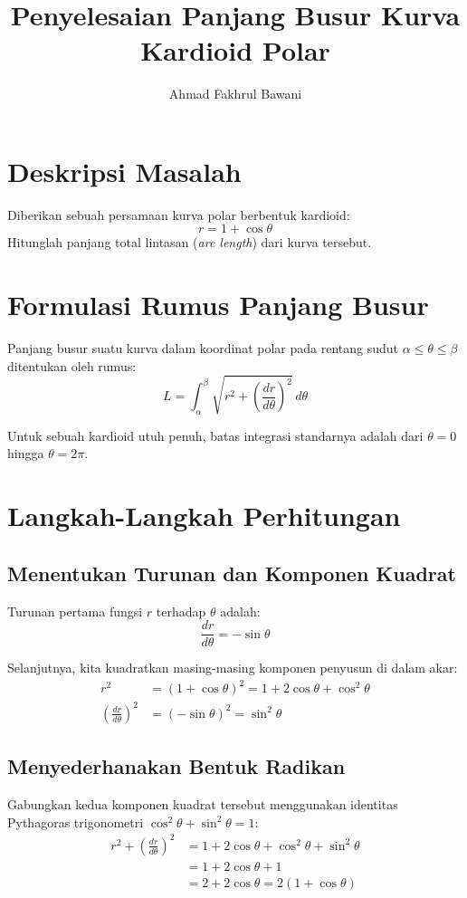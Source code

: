 \documentclass[11pt,a4paper]{article}
\title{\textbf{Penyelesaian Panjang Busur Kurva Kardioid Polar}}
\author{Ahmad Fakhrul Bawani}
\date{}
\begin{document}
\maketitle

\section{Deskripsi Masalah}
Diberikan sebuah persamaan kurva polar berbentuk kardioid:
\begin{equation}
  r = 1 + \cos\theta
\end{equation}
Hitunglah panjang total lintasan (\textit{arc length}) dari kurva tersebut.

\section{Formulasi Rumus Panjang Busur}
Panjang busur suatu kurva dalam koordinat polar pada rentang sudut $\alpha \le \theta \le \beta$ ditentukan oleh rumus:
\begin{equation}
  L = \int_{\alpha}^{\beta} \sqrt{r^2 + \left(\frac{dr}{d\theta}\right)^2} \, d\theta
\end{equation}

Untuk sebuah kardioid utuh penuh, batas integrasi standarnya adalah dari $\theta = 0$ hingga $\theta = 2\pi$.

\section{Langkah-Langkah Perhitungan}

\subsection{Menentukan Turunan dan Komponen Kuadrat}
Turunan pertama fungsi $r$ terhadap $\theta$ adalah:
\begin{equation*}
  \frac{dr}{d\theta} = -\sin\theta
\end{equation*}

Selanjutnya, kita kuadratkan masing-masing komponen penyusun di dalam akar:
\begin{align*}
  r^2 &= (1 + \cos\theta)^2 = 1 + 2\cos\theta + \cos^2\theta \\
  \left(\frac{dr}{d\theta}\right)^2 &= (-\sin\theta)^2 = \sin^2\theta
\end{align*}

\subsection{Menyederhanakan Bentuk Radikan}
Gabungkan kedua komponen kuadrat tersebut menggunakan identitas Pythagoras trigonometri $\cos^2\theta + \sin^2\theta = 1$:
\begin{align*}
  r^2 + \left(\frac{dr}{d\theta}\right)^2 &= 1 + 2\cos\theta + \cos^2\theta + \sin^2\theta \\
  &= 1 + 2\cos\theta + 1 \\
  &= 2 + 2\cos\theta = 2(1 + \cos\theta)
\end{align*}
\end{document}
